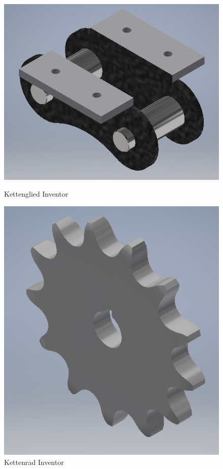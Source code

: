 \begin{figure}[H]
   \begin{minipage}[hbt]{.4\linewidth} %
      \includegraphics[width=\linewidth]{Bilder/Inventor/Kettenglied}
      \caption{Kettenglied Inventor}
      \label{Kettenglied_Inventor} 
   \end{minipage}
   \hspace{.2\linewidth}%
   \begin{minipage}[hbt]{.35\linewidth} %
      \includegraphics[width=\linewidth]{Bilder/Inventor/Kettenrad}
      \caption{Kettenrad Inventor}
      \label{Kettenrad_Inventor}
   \end{minipage}
\end{figure}


